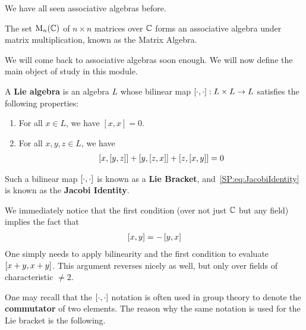 We have all seen associative algebras before.

\begin{boxexample}\label{Ch1:Eg:MatrixAlgebra}
    The set $\operatorname{M}_{n}\!\left( \mathbb{C} \right)$ of $n \times n$ matrices over $\mathbb{C}$ forms an associative algebra under matrix multiplication, known as the Matrix Algebra.
\end{boxexample}

We will come back to associative algebras soon enough. We will now define the main object of study in this module.

\begin{boxdefinition}
    A \textbf{Lie algebra} is an algebra $L$ whose bilinear map $\left[ \cdot, \cdot \right]: L \times L \to L$ satisfies the following properties:
    \begin{enumerate}
        \item For all $x \in L$, we have $[x, x] = 0$.
        \item For all $x, y, z \in L$, we have
        \begin{align}
            \left[ x, \left[ y, z \right] \right] + \left[ y, \left[ z, x \right] \right] + \left[ z, \left[ x, y \right] \right] = 0
            \label{SP:eq:JacobiIdentity}
        \end{align}
    \end{enumerate}
    Such a bilinear map $\left[ \cdot, \cdot \right]$ is known as a \textbf{Lie Bracket}, and~\eqref{SP:eq:JacobiIdentity} is known as the \textbf{Jacobi Identity}.
\end{boxdefinition}

\begin{remark}
    We immediately notice that the first condition (over not just $\mathbb{C}$ but any field) implies the fact that
    \begin{align}
        \left[ x, y \right] = - \left[ y, x \right]
        \label{SP:Eq:LieBracSymmNeg}
    \end{align}
    One simply needs to apply bilinearity and the first condition to evaluate $\left[ x + y, x + y \right]$. This argument reverses nicely as well, but only over fields of characteristic $\neq 2$.
\end{remark} 

One may recall that the $\left[ \cdot, \cdot \right]$ notation is often used in group theory to denote the \textbf{commutator} of two elements. The reason why the same notation is used for the Lie bracket is the following.

